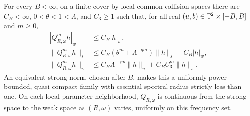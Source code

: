 \begin{proposition}
\label{prop:bounded-band-LY}
For every $B<\infty$, on a finite cover by local common collision
spaces there are $C_B<\infty$, $0<\theta<1<\Lambda$, and $C_3\ge1$
such that, for all real $(u,b)\in\mathbb T^2\times[-B,B]$ and $m\ge0$,
\begin{align}
 |Q_{R,\omega}^m h|_w&\le C_B|h|_w,
                                               \label{eq:roof-LY-weak}\\
 \|Q_{R,\omega}^m h\|_s
 &\le C_B(\theta^m+\Lambda^{-qm})\|h\|_s+C_B|h|_w,
                                               \label{eq:roof-LY-stable}\\
 \|Q_{R,\omega}^m h\|_u
 &\le C_B\Lambda^{-\gamma m}\|h\|_u+C_B C_3^m\|h\|_s.
                                               \label{eq:roof-LY-unstable}
\end{align}
An equivalent strong norm, chosen after $B$, makes this a uniformly
power-bounded, quasi-compact family with essential spectral radius
strictly less than one. On each local parameter neighborhood,
$Q_{R,\omega}$ is continuous from the strong space to the weak space
as $(R,\omega)$ varies, uniformly on this frequency set.
\end{proposition}
